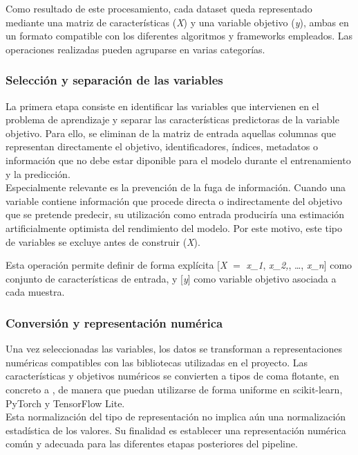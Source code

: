 \documentclass[a4paper,12pt,twoside,final]{book}
\begin{document}
Como resultado de este procesamiento, cada dataset queda representado mediante una matriz de características
(\textit{X}) y una variable objetivo (\textit{y}), ambas en un formato compatible con los diferentes algoritmos y
frameworks empleados. Las operaciones realizadas pueden agruparse en varias categorías.

\subsubsection{Selección y separación de las variables}
La primera etapa consiste en identificar las variables que intervienen en el problema de aprendizaje y separar las
características predictoras de la variable objetivo. Para ello, se eliminan de la matriz de entrada aquellas
columnas que representan directamente el objetivo, identificadores, índices, metadatos o información que no debe estar
diponible para el modelo durante el entrenamiento y la predicción.\\

Especialmente relevante es la prevención de la fuga de información. Cuando una variable contiene información que
procede directa o indirectamente del objetivo que se pretende predecir, su utilización como entrada produciría una
estimación artificialmente optimista del rendimiento del modelo. Por este motivo, este tipo de variables se excluye
antes de construir (\textit{X}).

Esta operación permite definir de forma explícita [\textit{X} $=$ \textit{x\_1}, \textit{x\_2,}, \ldots, \textit{x\_n}]
como conjunto de características de entrada, y [\textit{y}] como variable objetivo asociada a cada muestra.

\subsubsection{Conversión y representación numérica}
Una vez seleccionadas las variables, los datos se transforman a representaciones numéricas compatibles con las
bibliotecas utilizadas en el proyecto. Las características y objetivos numéricos se convierten a tipos de coma
flotante, en concreto a , de manera que puedan utilizarse de forma uniforme en scikit-learn, PyTorch y
TensorFlow Lite.\\

Esta normalización del tipo de representación no implica aún una normalización estadística de los valores. Su
finalidad es establecer una representación numérica común y adecuada para las diferentes etapas posteriores del
pipeline.
\end{document}
